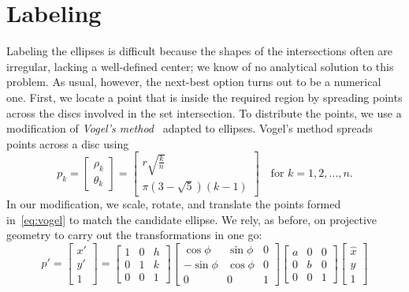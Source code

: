 \documentclass[
  oneside,
  openany,
  numbers=noendperiod,
  parskip=half,
  bibliography=totoc
]{scrbook}\usepackage[]{graphicx}\usepackage{xcolor}
\begin{document}
\section{Labeling}
\label{sec:labeling}

Labeling the ellipses is difficult because the shapes of the intersections
often are irregular, lacking a well-defined center; we know of no analytical
solution to this problem. As usual, however, the next-best option turns out to
be a numerical one. First, we locate a point that is inside the required region
by spreading points across the discs involved in the set intersection. To
distribute the points, we use a modification of
\emph{Vogel's method}~\citep{Arthur_2015,Vogel_1979} adapted to ellipses.
Vogel's method spreads points across a disc using
\begin{equation}
p_k =
\begin{bmatrix}
  \rho_k \\
  \theta_k
\end{bmatrix} =
\begin{bmatrix}
  r \sqrt{\frac{k}{n}}\\
  \pi (3 - \sqrt{5})(k - 1)
\end{bmatrix}\quad\text{for } k = 1, 2,\dots, n.
\label{eq:vogel}
\end{equation}
In our modification, we scale, rotate, and translate the points formed
in~\eqref{eq:vogel} to match the candidate ellipse. We rely, as before, on
projective geometry to carry out the transformations in one go:
\[
p' =
\begin{bmatrix}
  x' \\
  y' \\
  1
\end{bmatrix} =
\begin{bmatrix}
  1 & 0 & h \\
  0 & 1 & k \\
  0 & 0 & 1
\end{bmatrix}
\begin{bmatrix}
  \cos{\phi}  & \sin{\phi} & 0 \\
  -\sin{\phi} & \cos{\phi} & 0\\
  0           & 0          & 1
\end{bmatrix}
\begin{bmatrix}
  a & 0 & 0 \\
  0 & b & 0 \\
  0 & 0 & 1
\end{bmatrix}
\begin{bmatrix}
  \hat{x} \\
  \hat{y} \\
  1
\end{bmatrix}
\]
\end{document}
